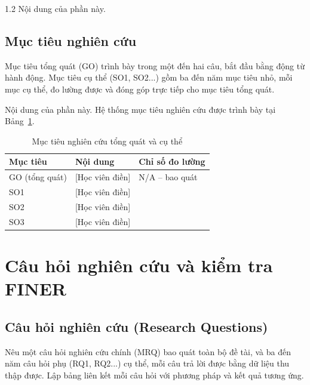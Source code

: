 \begin{spacing}{1.2}
Nội dung của phần này.

\subsection{Mục tiêu nghiên cứu}
\label{subsec:muc_tieu}

\begin{huongdan}
Mục tiêu tổng quát (GO) trình bày trong một đến hai câu, bắt đầu bằng động từ hành động. Mục tiêu cụ thể (SO1, SO2...) gồm ba đến năm mục tiêu nhỏ, mỗi mục cụ thể, đo lường được và đóng góp trực tiếp cho mục tiêu tổng quát.
\end{huongdan}

Nội dung của phần này. Hệ thống mục tiêu nghiên cứu được trình bày tại Bảng~\ref{tab:muc_tieu}.

\begin{table}[htpb]
\centering
\caption{Mục tiêu nghiên cứu tổng quát và cụ thể}
\label{tab:muc_tieu}
\renewcommand{\arraystretch}{1.3}
{\fontsize{12}{14}\selectfont
\begin{tabularx}{\textwidth}{|>{\raggedright\arraybackslash}p{2.6cm}|X|>{\raggedright\arraybackslash}p{4cm}|}
\hline
\textbf{Mục tiêu} & \textbf{Nội dung} & \textbf{Chỉ số đo lường} \\
\hline
GO (tổng quát) & [Học viên điền] & N/A -- bao quát \\
\hline
SO1 & [Học viên điền] & [Chỉ số cụ thể] \\
\hline
SO2 & [Học viên điền] & [Chỉ số cụ thể] \\
\hline
SO3 & [Học viên điền] & [Chỉ số cụ thể] \\
\hline
\end{tabularx}
}
\end{table}

\section{Câu hỏi nghiên cứu và kiểm tra FINER}
\label{sec:rq_finer}

\subsection{Câu hỏi nghiên cứu (Research Questions)}
\label{subsec:rq}

\begin{huongdan}
Nêu một câu hỏi nghiên cứu chính (MRQ) bao quát toàn bộ đề tài, và ba đến năm câu hỏi phụ (RQ1, RQ2...) cụ thể, mỗi câu trả lời được bằng dữ liệu thu thập được. Lập bảng liên kết mỗi câu hỏi với phương pháp và kết quả tương ứng.
\end{huongdan}


\end{spacing}
